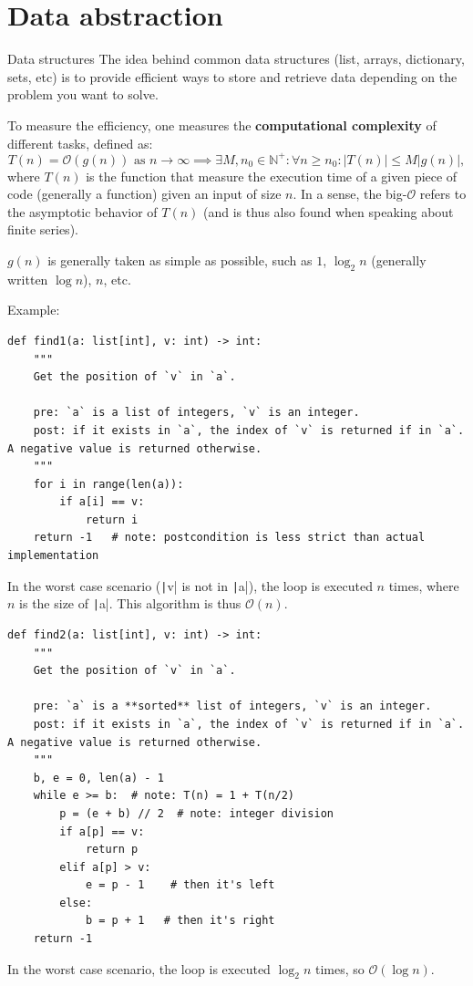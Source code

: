 \documentclass[10pt,
aspectratio=169
]{beamer}
\begin{document}
\section{Data abstraction}


\newcommand{\Ox}[1]{\ensuremath{\mathcal{O}(#1)}}

\begin{frame}{Data structures}
The idea behind common data structures (list, arrays, dictionary, sets, etc) is to provide efficient ways to store and retrieve data depending on the problem you want to solve.

To measure the efficiency, one measures the \textbf{computational complexity} of different tasks, defined as:\begin{equation*}
	T(n) = \mathcal{O}(g(n))  \text{ as } n\to\infty \implies \exists M, n_0\in\mathbb{N}^+: \forall n\geq n_0: |T(n)| \leq M |g(n)|,
\end{equation*}
where $T(n)$ is the function that measure the execution time of a given piece of code (generally a function) given an input of size $n$. In a sense, the big-$\mathcal{O}$ refers to the asymptotic behavior of $T(n)$ (and is thus also found when speaking about finite series). 

$g(n)$ is generally taken as simple as possible, such as $1$, $\log_2 n$ (generally written $\log n$), $n$, etc.
\end{frame}


\begin{frame}[fragile]
	Example:\begin{verbatim}
def find1(a: list[int], v: int) -> int:
	"""
	Get the position of `v` in `a`.
	
	pre: `a` is a list of integers, `v` is an integer.
	post: if it exists in `a`, the index of `v` is returned if in `a`. A negative value is returned otherwise.
	"""
	for i in range(len(a)): 
		if a[i] == v:
			return i 
	return -1   # note: postcondition is less strict than actual implementation
	\end{verbatim}
In the worst case scenario (\texttt|v| is not in \texttt|a|), the loop is executed $n$ times, where $n$ is the size of \texttt|a|. This algorithm is thus $\Ox n$.
\end{frame}

\begin{frame}[fragile]
\begin{verbatim}
def find2(a: list[int], v: int) -> int:
	"""
	Get the position of `v` in `a`.
	
	pre: `a` is a **sorted** list of integers, `v` is an integer.
	post: if it exists in `a`, the index of `v` is returned if in `a`. A negative value is returned otherwise.
	"""
	b, e = 0, len(a) - 1
	while e >= b:  # note: T(n) = 1 + T(n/2)
		p = (e + b) // 2  # note: integer division
		if a[p] == v:
			return p
		elif a[p] > v:
			e = p - 1    # then it's left
		else:
			b = p + 1   # then it's right
	return -1
\end{verbatim}
In the worst case scenario, the loop is executed $\log_2 n$ times, so $\Ox{\log n}$.
\end{frame}
\end{document}

